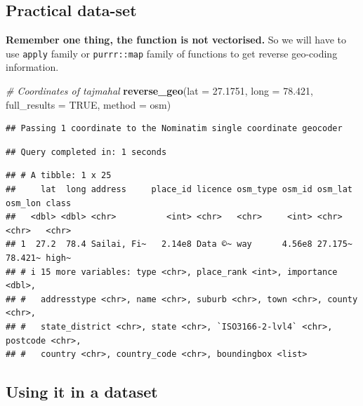 \documentclass[
]{book}
\newenvironment{Shaded}{\begin{snugshade}}{\end{snugshade}}
\newcommand{\AttributeTok}[1]{\textcolor[rgb]{0.13,0.29,0.53}{#1}}
\newcommand{\CommentTok}[1]{\textcolor[rgb]{0.56,0.35,0.01}{\textit{#1}}}
\newcommand{\ConstantTok}[1]{\textcolor[rgb]{0.56,0.35,0.01}{#1}}
\newcommand{\FloatTok}[1]{\textcolor[rgb]{0.00,0.00,0.81}{#1}}
\newcommand{\FunctionTok}[1]{\textcolor[rgb]{0.13,0.29,0.53}{\textbf{#1}}}
\newcommand{\NormalTok}[1]{#1}
\newcommand{\StringTok}[1]{\textcolor[rgb]{0.31,0.60,0.02}{#1}}
\begin{document}
\hypertarget{practical-data-set}{%
\subsection{Practical data-set}\label{practical-data-set}}

\textbf{Remember one thing, the function is not vectorised.} So we will have to use \texttt{apply} family or \texttt{purrr::map} family of functions to get reverse geo-coding information.

\begin{Shaded}
\begin{Highlighting}[]
\CommentTok{\# Coordinates of tajmahal}
\FunctionTok{reverse\_geo}\NormalTok{(}\AttributeTok{lat =} \FloatTok{27.1751}\NormalTok{, }
            \AttributeTok{long =} \FloatTok{78.421}\NormalTok{, }
            \AttributeTok{full\_results =} \ConstantTok{TRUE}\NormalTok{, }
            \AttributeTok{method =} \StringTok{\textquotesingle{}osm\textquotesingle{}}\NormalTok{)}
\end{Highlighting}
\end{Shaded}

\begin{verbatim}
## Passing 1 coordinate to the Nominatim single coordinate geocoder
\end{verbatim}

\begin{verbatim}
## Query completed in: 1 seconds
\end{verbatim}

\begin{verbatim}
## # A tibble: 1 x 25
##     lat  long address     place_id licence osm_type osm_id osm_lat osm_lon class
##   <dbl> <dbl> <chr>          <int> <chr>   <chr>     <int> <chr>   <chr>   <chr>
## 1  27.2  78.4 Sailai, Fi~   2.14e8 Data ©~ way      4.56e8 27.175~ 78.421~ high~
## # i 15 more variables: type <chr>, place_rank <int>, importance <dbl>,
## #   addresstype <chr>, name <chr>, suburb <chr>, town <chr>, county <chr>,
## #   state_district <chr>, state <chr>, `ISO3166-2-lvl4` <chr>, postcode <chr>,
## #   country <chr>, country_code <chr>, boundingbox <list>
\end{verbatim}

\hypertarget{using-it-in-a-dataset}{%
\subsection{Using it in a dataset}\label{using-it-in-a-dataset}}
\end{document}
